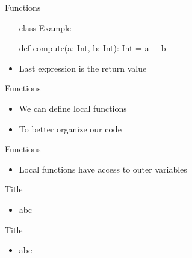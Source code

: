\begin{frame}[fragile]{Functions}
\begin{itemize}
\begin{chisel}
class Example {
  
  def compute(a: Int, b: Int): Int = {
    a + b
  }
}
\end{chisel}
\item Last expression is the return value
\end{itemize}
\end{frame}

\begin{frame}[fragile]{Functions}
\begin{itemize}
\begin{chisel}
class Example {
  
  def complexCompute(a: Int, b: Int, c: Int): Int = {
  
    def add(x: Int, y: Int) {
      x + y
    }
    
    add(a, b) + c
  }
}
\end{chisel}
\item We can define local functions
\item To better organize our code
\end{itemize}
\end{frame}

\begin{frame}[fragile]{Functions}
\begin{itemize}
\begin{chisel}
class Example {
  
  def complexCompute(a: Int, b: Int, c: Int): Int = {
  
    def add() {
      a + b
    }
    
    add() + c
  }
}
\end{chisel}
\item Local functions have access to outer variables
\end{itemize}
\end{frame}

\begin{frame}[fragile]{Title}
\begin{itemize}
\item abc
\end{itemize}
\end{frame}

\begin{frame}[fragile]{Title}
\begin{itemize}
\item abc
\end{itemize}
\end{frame}


